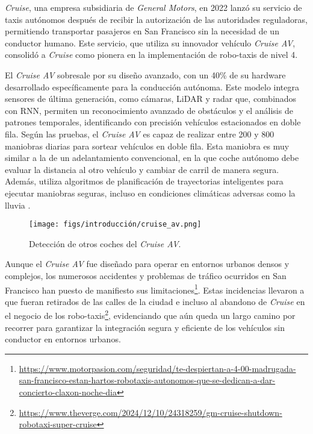 \textit{Cruise}, una empresa subsidiaria de \textit{General Motors}, en 2022 lanzó su servicio de taxis autónomos después de recibir la autorización de las autoridades reguladoras, permitiendo transportar pasajeros en San Francisco sin la necesidad de un conductor humano. Este servicio, que utiliza su innovador vehículo \textit{Cruise AV}, consolidó a \textit{Cruise} como pionera en la implementación de robo-taxis de nivel 4. 

El \textit{Cruise AV} sobresale por su diseño avanzado, con un 40\% de su hardware desarrollado específicamente para la conducción autónoma. Este modelo integra sensores de última generación, como cámaras, \ac{LiDAR} y radar que, combinados con \ac{RNN}, permiten un reconocimiento avanzado de obstáculos y el análisis de patrones temporales, identificando con precisión vehículos estacionados en doble fila. Según las pruebas, el \textit{Cruise AV} es capaz de realizar entre 200 y 800 maniobras diarias para sortear vehículos en doble fila. Esta maniobra es muy similar a la de un adelantamiento convencional, en la que coche autónomo debe evaluar la distancia al otro vehículo y cambiar de carril de manera segura. Además, utiliza algoritmos de planificación de trayectorias inteligentes para ejecutar maniobras seguras, incluso en condiciones climáticas adversas como la lluvia \cite{cruise}.

\begin{figure}[ht]
\begin{center}
\texttt{[image: figs/introducción/cruise\_av.png]}
\end{center}
\caption{Detección de otros coches del \textit{Cruise AV}.}
\label{fig:cruise}
\end{figure}

\newpage

Aunque el \textit{Cruise AV} fue diseñado para operar en entornos urbanos densos y complejos, los numerosos accidentes y problemas de tráfico ocurridos en San Francisco han puesto de manifiesto sus limitaciones\footnote{\url{https://www.motorpasion.com/seguridad/te-despiertan-a-4-00-madrugada-san-francisco-estan-hartos-robotaxis-autonomos-que-se-dedican-a-dar-concierto-claxon-noche-dia}}. Estas incidencias llevaron a que fueran retirados de las calles de la ciudad e incluso al abandono de \textit{Cruise} en el negocio de los robo-taxis\footnote{\url{https://www.theverge.com/2024/12/10/24318259/gm-cruise-shutdown-robotaxi-super-cruise}}, evidenciando que aún queda un largo camino por recorrer para garantizar la integración segura y eficiente de los vehículos sin conductor en entornos urbanos.

